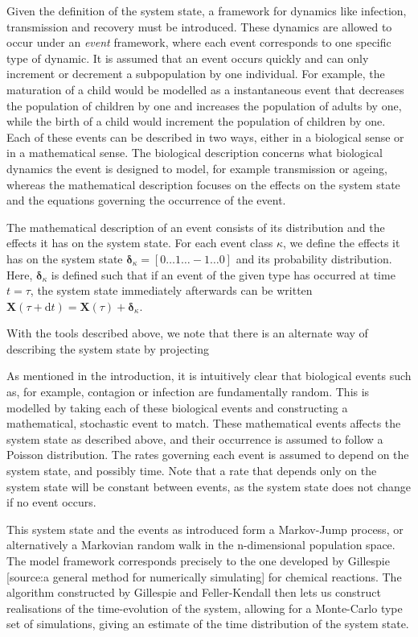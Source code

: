 \documentclass[10pt,a4paper]{article}
\begin{document}
Given the definition of the system state, a framework for dynamics like infection, transmission and recovery must be introduced. These dynamics are allowed to occur under an \emph{event} framework, where each event corresponds to one specific type of dynamic. It is assumed that an event occurs quickly and can only increment or decrement a subpopulation by one individual. For example, the maturation of a child would be modelled as a instantaneous event that decreases the population of children by one and increases the population of adults by one, while the birth of a child would increment the population of children by one. Each of these events can be described in two ways, either in a biological sense or in a mathematical sense. The biological description concerns what biological dynamics the event is designed to model, for example transmission or ageing, whereas the mathematical description focuses on the effects on the system state and the equations governing the occurrence of the event.

The mathematical description of an event consists of its distribution and the effects it has on the system state. For each event class $\kappa$, we define the effects it has on the system state $\bm{\delta}_\kappa = \left[ 0 \ldots 1 \ldots -1 \ldots 0 \right]$ and its probability distribution. Here, $\bm{\delta}_\kappa$ is defined such that if an event of the given type has occurred at time $t = \tau$, the system state immediately afterwards can be written $\bm{X} \left( \tau + \mathrm{d} t \right) = \bm{X} \left( \tau \right) + \bm{\delta}_\kappa$. 

With the tools described above, we note that there is an alternate way of describing the system state by projecting 


As mentioned in the introduction, it is intuitively clear that biological events such as, for example, contagion or infection are fundamentally random. This is modelled by taking each of these biological events and constructing a mathematical, stochastic event to match. These mathematical events affects the system state as described above, and their occurrence is assumed to follow a Poisson distribution. The rates governing each event is assumed to depend on the system state, and possibly time. Note that a rate that depends only on the system state will be constant between events, as the system state does not change if no event occurs.

This system state and the events as introduced form a Markov-Jump process, or alternatively a Markovian random walk in the n-dimensional population space. The model framework corresponds precisely to the one developed by Gillespie [source:a general method for numerically simulating] for chemical reactions. The algorithm constructed by Gillespie and Feller-Kendall then lets us construct realisations of the time-evolution of the system, allowing for a Monte-Carlo type set of simulations, giving an estimate of the time distribution of the system state.
\end{document}

